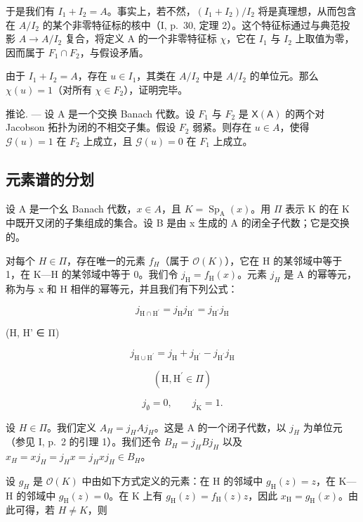 于是我们有 \(I_{1} + I_{2} = A\)。事实上，若不然，\((I_{1} + I_{2})/I_{2}\) 将是真理想，从而包含在 \(A/I_{2}\) 的某个非零特征标的核中（I, p.~30, 定理 2）。这个特征标通过与典范投影 \(A \rightarrow A/I_{2}\) 复合，将定义 A 的一个非零特征标 \(\chi\)，它在 \(I_{1}\) 与 \(I_{2}\) 上取值为零，因而属于 \(F_{1} \cap F_{2}\)，与假设矛盾。

由于 \(I_{1} + I_{2} = A\)，存在 \(u \in I_{1}\)，其类在 \(A/I_{2}\) 中是 \(A/I_{2}\) 的单位元。那么 \(\chi(u) = 1\)（对所有 \(\chi \in F_{2}\)），证明完毕。

推论. --- 设 A 是一个交换 Banach 代数。设 \(F_{1}\) 与 \(F_{2}\) 是 \(\mathsf{X}(\mathsf{A})\) 的两个对 Jacobson 拓扑为闭的不相交子集。假设 \(F_{2}\) 弱紧。则存在 \(u \in A\)，使得 \(\mathcal{G}(u) = 1\) 在 \(F_{2}\) 上成立，且 \(\mathcal{G}(u) = 0\) 在 \(F_{1}\) 上成立。

\subsection{元素谱的分划}

设 A 是一个幺 Banach 代数，\(x \in A\)，且 \(K = \operatorname{Sp}_{\mathrm{A}}(x)\)。用 \(\Pi\) 表示 K 的在 K 中既开又闭的子集组成的集合。设 B 是由 x 生成的 A 的闭全子代数；它是交换的。

对每个 \(H \in \Pi\)，存在唯一的元素 \(f_{H}\)（属于 \(\mathcal{O}(K)\)），它在 H 的某邻域中等于 1，在 K---H 的某邻域中等于 0。我们令 \(j_{\mathrm{H}} = f_{\mathrm{H}}(x)\)。元素 \(j_{H}\) 是 A 的幂等元，称为与 x 和 H 相伴的幂等元，并且我们有下列公式：

\[
j _ {\mathrm{H} \cap \mathrm{H} ^ {\prime}} = j _ {\mathrm{H}} j _ {\mathrm{H} ^ {\prime}} = j _ {\mathrm{H} ^ {\prime}} j _ {\mathrm{H}}\tag{15}
\]

(H, H' ∈ Π)

\[
j _ {\mathrm {H\cup H^ {\prime}}} = j _ {\mathrm{H}} + j _ {\mathrm {H^ {\prime}}} - j _ {\mathrm {H^ {\prime}}} j _ {\mathrm{H}}\tag{16}
\]

\[
(\mathrm{H}, \mathrm{H} ^ {\prime} \in \Pi)
\]

\[
j _ {\emptyset} = 0, \qquad j _ {\mathrm{K}} = 1.
\]

设 \(H \in \Pi\)。我们定义 \(A_{H} = j_{H}Aj_{H}\)。这是 A 的一个闭子代数，以 \(j_{H}\) 为单位元（参见 I, p.~2 的引理 1）。我们还令 \(B_{H} = j_{H}Bj_{H}\) 以及 \(x_{H} = xj_{H} = j_{H}x = j_{H}xj_{H} \in B_{H}\)。

设 \(g_{H}\) 是 \(\mathcal{O}(K)\) 中由如下方式定义的元素：在 H 的邻域中 \(g_{\mathrm{H}}(z)=z\)，在 K---H 的邻域中 \(g_{\mathrm{H}}(z)=0\)。在 K 上有 \(g_{\mathrm{H}}(z)=f_{\mathrm{H}}(z)z\)，因此 \(x_{\mathrm{H}}=g_{\mathrm{H}}(x)\)。由此可得，若 \(H\neq K\)，则

